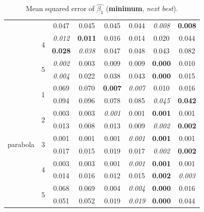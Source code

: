 \documentclass[authoryear, review, 11pt]{elsarticle}
\begin{document}
\begin{table}
\begin{center}
\begin{tabular}{cccccccc}
   &  & 0.047 & 0.045 & 0.045 & 0.044 & \emph{0.008} & \textbf{0.008} \\ 
   \cline{3-8}
   & \multirow{2}{*}{4} & \emph{0.012} & \textbf{0.011} & 0.016 & 0.014 & 0.020 & 0.044 \\ 
   &  & \textbf{0.028} & \emph{0.038} & 0.047 & 0.048 & 0.043 & 0.082 \\ 
   \cline{3-8}
   & \multirow{2}{*}{5} & \emph{0.002} & 0.003 & 0.009 & 0.009 & \textbf{0.000} & 0.010 \\ 
   &  & \emph{0.004} & 0.022 & 0.038 & 0.043 & \textbf{0.000} & 0.015 \\ 
   \hline
   \multirow{10}{*}{parabola} & \multirow{2}{*}{1} & 0.069 & 0.070 & \textbf{0.007} & \emph{0.007} & 0.010 & 0.016 \\ 
   &  & 0.094 & 0.096 & 0.078 & 0.085 & \emph{0.045} & \textbf{0.042} \\ 
   \cline{3-8}
   & \multirow{2}{*}{2} & 0.003 & 0.003 & \emph{0.001} & 0.001 & \textbf{0.001} & 0.001 \\ 
   &  & 0.013 & 0.008 & 0.013 & 0.009 & \emph{0.002} & \textbf{0.002} \\ 
   \cline{3-8}
   & \multirow{2}{*}{3} & 0.001 & 0.001 & 0.001 & \emph{0.001} & \textbf{0.001} & 0.001 \\ 
   &  & 0.017 & 0.015 & 0.019 & 0.017 & \emph{0.002} & \textbf{0.002} \\ 
   \cline{3-8}
   & \multirow{2}{*}{4} & 0.003 & 0.003 & 0.001 & \emph{0.001} & \textbf{0.001} & 0.001 \\ 
   &  & 0.014 & 0.016 & 0.012 & 0.015 & \textbf{0.002} & \emph{0.003} \\ 
   \cline{3-8}
   & \multirow{2}{*}{5} & 0.068 & 0.069 & 0.004 & \emph{0.004} & \textbf{0.000} & 0.016 \\ 
   &  & 0.051 & 0.052 & 0.019 & \emph{0.019} & \textbf{0.000} & 0.044 \\ 
  \end{tabular}
\caption{Mean squared error of $\hat{\beta_1}$ (\textbf{minimum}, \emph{next best}).\label{table:X1-mse}}
\end{center}
\end{table}
\end{document}
